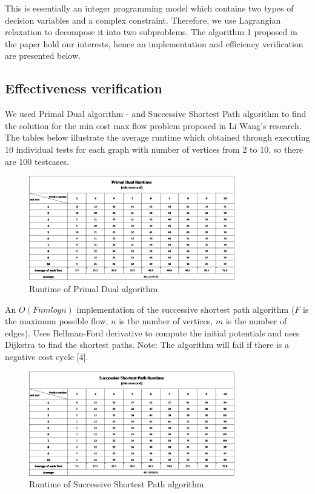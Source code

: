 	\qquad This is essentially an integer programming model which contains two types of decision variables and a complex constraint. Therefore, we use Lagrangian relaxation to decompose it into two subproblems. The algorithm 1 proposed in the paper hold our interests, hence an implementation and efficiency verification are presented below.

	\subsection{Effectiveness verification}

	\qquad We used Primal Dual algorithm - and Successive Shortest Path algorithm to find the solution for the min cost max flow problem proposed in Li Wang’s research. The tables below illustrate the average runtime which obtained through executing 10 individual tests for each graph with number of vertices from 2 to 10, so there are 100 testcases.
	
	\begin{figure}[htbp]
		\centering
		\includegraphics[width=0.8\textwidth]{graphics/table1.png}
		\caption{Runtime of Primal Dual algorithm}
	\end{figure}

	An $O(Fnmlogn)$ implementation of the successive shortest path algorithm ($F$ is the maximum possible flow, $n$ is the number of vertices, $m$ is the number of edges). Uses Bellman-Ford derivative to compute the initial potentials and uses Dijkstra to find the shortest paths. Note: The algorithm will fail if there is a negative cost cycle [4].

	\begin{figure}[htbp]
		\centering
		\includegraphics[width=0.8\textwidth]{graphics/table2.png}
		\caption{Runtime of Successive Shortest Path algorithm}
	\end{figure}

